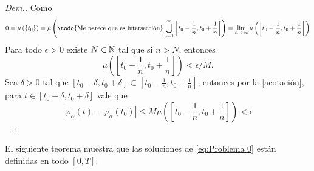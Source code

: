 \begin{proof}[Dem.]
Como $$0=\mu\left(\{t_0\}\right)=\mu\left(\textrm{\todo{Me parece que es intersección}}\bigcup_{n=1}^{\infty}\left[t_0-\frac{1}{n},t_0+\frac{1}{n}\right]\right)=\lim_{n\to\infty}\mu\left(\left[t_0-\frac{1}{n},t_0+\frac{1}{n}\right]\right)$$    
Para todo $\epsilon>0$ existe $N\in\mathbb{N}$ tal que si $n>N$, entonces $$\mu\left(\left[t_0-\frac{1}{n},t_0+\frac{1}{n}\right]\right)<\epsilon/M.$$
Sea $\delta>0$ tal que  $\left[t_0-\delta,t_0+\delta\right]\subset\left[t_0-\frac{1}{n},t_0+\frac{1}{n}\right]$, entonces por la  \ref{acotación}, para $t\in \left[t_0-\delta,t_0+\delta\right]$ vale que
\begin{equation*}
    |\varphi_\alpha(t)-\varphi_\alpha(t_0)|\leq M\mu\left(\left[t_0-\frac{1}{n},t_0+\frac{1}{n}\right]\right)<\epsilon
\end{equation*}

\end{proof}




El siguiente teorema muestra que las soluciones de \eqref{eq:Problema 0}  están definidas en todo $[0,T]$.

